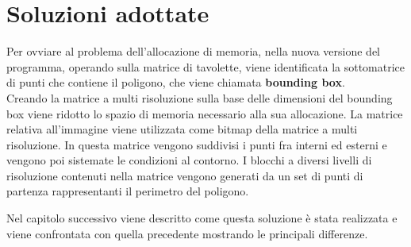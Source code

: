 	\section{Soluzioni adottate}
	Per ovviare al problema dell'allocazione di memoria, nella nuova versione del programma, operando sulla matrice di tavolette, viene identificata la sottomatrice di punti che contiene il poligono, che viene chiamata \textbf{bounding box}.\\
	Creando la matrice a multi risoluzione sulla base delle dimensioni del bounding box viene ridotto lo spazio di memoria necessario alla sua allocazione. 
	La matrice relativa all'immagine viene utilizzata come bitmap della matrice a multi risoluzione. In questa matrice vengono suddivisi i punti fra interni ed esterni e vengono poi sistemate le condizioni al contorno. I blocchi a diversi livelli di risoluzione contenuti nella matrice vengono generati da un set di punti di partenza rappresentanti il perimetro del poligono.

	Nel capitolo successivo viene descritto come questa soluzione \`{e} stata realizzata e viene confrontata con quella precedente mostrando le principali differenze.